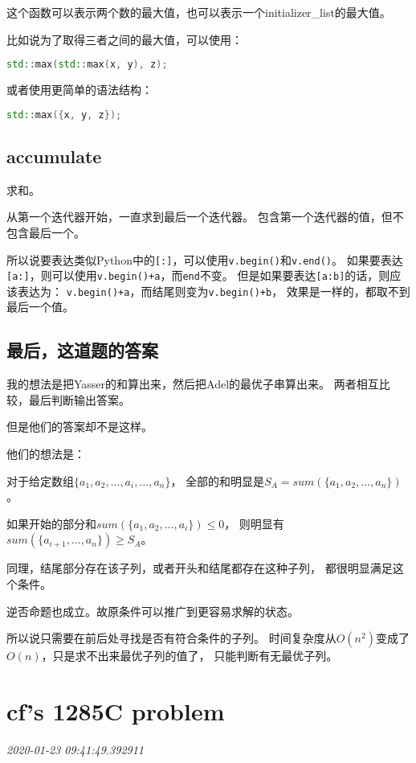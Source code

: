 \documentclass{peterlitsdoc}
\newcommand{\timetx}[1]
    {\par\noindent\emph{\pltgray\small #1}\vspace{2em}}
\newcommand{\vb}{\verb}
\begin{document}
这个函数可以表示两个数的最大值，也可以表示一个initializer\_list的最大值。

比如说为了取得三者之间的最大值，可以使用：
\begin{lstlisting}[language=C++]
std::max(std::max(x, y), z);
\end{lstlisting}
或者使用更简单的语法结构：
\begin{lstlisting}[language=C++]
std::max({x, y, z});
\end{lstlisting}

\subsection{accumulate}
求和。

从第一个迭代器开始，一直求到最后一个迭代器。
包含第一个迭代器的值，但不包含最后一个。

所以说要表达类似Python中的\vb|[:]|，可以使用\vb|v.begin()|和\vb|v.end()|。
如果要表达\vb|[a:]|，则可以使用\vb|v.begin()+a|，而\vb|end|不变。
但是如果要表达\vb|[a:b]|的话，则应该表达为：
\vb|v.begin()+a|，而结尾则变为\vb|v.begin()+b|，
效果是一样的，都取不到最后一个值。

\subsection{最后，这道题的答案}
我的想法是把Yasser的和算出来，然后把Adel的最优子串算出来。
两者相互比较，最后判断输出答案。

但是他们的答案却不是这样。

他们的想法是：

对于给定数组$\{a_1, a_2, \ldots, a_i, \ldots, a_n\}$，
全部的和明显是$S_A = sum(\{a_1, a_2, \ldots, a_n\})$。

如果开始的部分和$sum(\{a_1, a_2, \ldots, a_i\}) \le 0$，
则明显有$sum(\{a_{i+1}, \ldots, a_n\}) \ge S_A$。

同理，结尾部分存在该子列，或者开头和结尾都存在这种子列，
都很明显满足这个条件。

逆否命题也成立。故原条件可以推广到更容易求解的状态。

所以说只需要在前后处寻找是否有符合条件的子列。
时间复杂度从$O(n^2)$变成了$O(n)$，只是求不出来最优子列的值了，
只能判断有无最优子列。


\section{cf's 1285C problem}\timetx{2020-01-23 09:41:49.392911}
\end{document}
